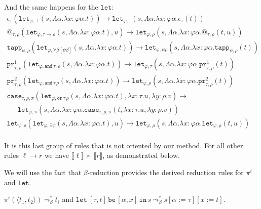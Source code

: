 \documentclass[a4paper,UKenglish,cleveref,autoref,numberwithinsect]{lipics-v2019}
\theoremstyle{definition}
\newcommand{\arrtype}{\rightarrow}
\newcommand{\subst}[2]{#1:=#2}
\newcommand{\abs}[2]{\lambda #1.#2}
\newcommand{\tabs}[2]{\Lambda #1.#2}
\newcommand{\pair}[2]{\langle #1,#2 \rangle}
\newcommand{\expair}[2]{[#1,#2]}
\newcommand{\red}{\longrightarrow}
\newcommand{\interpret}[1]{\llbracket #1 \rrbracket}
\newcommand{\xlet}[4]{\mathtt{let}_{#1}\,#2\,\mathtt{be}\,[#3]\,\mathtt{in}\,#4}
\newcommand{\proj}{\mathtt{pr}}
\begin{document}
And the same happens for the $\mathtt{let}$:
\[
\begin{array}{l}
\epsilon_\tau(\mathtt{let}_{\varphi,\bot}(s,\tabs{\alpha}{
  \abs{x:\varphi\alpha}{t}})) \red
  \mathtt{let}_{\varphi,\tau}(s,\tabs{\alpha}{\abs{x:\varphi\alpha}{
  \epsilon_\tau(t)}}) \\
@_{\tau,\rho}(\mathtt{let}_{\varphi, \tau \arrtype
  \rho}(s,\tabs{\alpha}{\abs{x:\varphi\alpha}{t}}),u) \red
  \mathtt{let}_{\varphi,\rho}(s,\tabs{\alpha}{\abs{x:\varphi\alpha}{
  @_{\tau,\rho}(t,u)}}) \\
\mathtt{tapp}_{\psi,\rho}(\mathtt{let}_{\varphi,
  \forall\beta[\psi\beta]}(s,\tabs{\alpha}{\abs{x:\varphi\alpha}{t}}))
  \red 
  \mathtt{let}_{\varphi,\psi\rho}(s,\tabs{\alpha}{\abs{x:\varphi\alpha}{
  \mathtt{tapp}_{\psi,\rho}(t)}}) \\
\proj^1_{\tau,\rho}(\mathtt{let}_{\varphi,
  \mathtt{and}\,\tau,\rho}(s,\tabs{\alpha}{\abs{x:\varphi\alpha}{t}}))
  \red
  \mathtt{let}_{\varphi,\tau}(s,\tabs{\alpha}{\abs{x:\varphi\alpha}{
  \proj^1_{\tau,\rho}(t)}}) \\
\proj^2_{\tau,\rho}(\mathtt{let}_{\varphi,
  \mathtt{and}\,\tau\,\rho}(s,\tabs{\alpha}{\abs{x:\varphi\alpha}{t}}))
  \red
  \mathtt{let}_{\varphi,\rho}(s,\tabs{\alpha}{\abs{x:\varphi\alpha}{
  \proj^2_{\tau,\rho}(t)}}) \\
\mathtt{case}_{\tau,\rho,\pi}(
  \mathtt{let}_{\varphi,\mathtt{or}\,\tau\,\rho}(s,\tabs{\alpha}{
  \abs{x:\varphi\alpha}{t}}),\abs{x:\tau}{u},\abs{y:\rho}{v})
  \red \\
\phantom{AB}
  \mathtt{let}_{\varphi,\pi}(s,\tabs{\alpha}{\abs{x:\varphi\alpha}{
  \mathtt{case}_{\tau,\rho,\pi}(t,\abs{x:\tau}{u},\abs{y:\rho}{v})}}) \\
\mathtt{let}_{\psi,\rho}(\mathtt{let}_{\varphi,\exists\psi}(s,
  \tabs{\alpha}{\abs{x:\varphi\alpha}{t}}),u) \red
  \mathtt{let}_{\varphi,\rho}(s,\tabs{\alpha}{\abs{x:\varphi\alpha}{
  \mathtt{let}_{\psi,\rho}(t,u)}}) \\
\end{array}
\]

It is this last group of rules that is not oriented by our method.
For all other rules $\ell \red r$ we have $\interpret{\ell} \succ
\interpret{r}$, as demonstrated below.

We will use the fact that $\beta$-reduction provides the derived
reduction rules for $\pi^i$ and $\mathtt{let}$.

\begin{lemma}\label{lem:encodings_reduce}
  $\pi^i(\pair{t_1}{t_2}) \leadsto_\beta^* t_i$ and
  $\xlet{}{\expair{\tau}{t}}{\alpha,x}{s} \leadsto_\beta^*
  s[\subst{\alpha}{\tau}][\subst{x}{t}]$.
\end{lemma}
\end{document}
